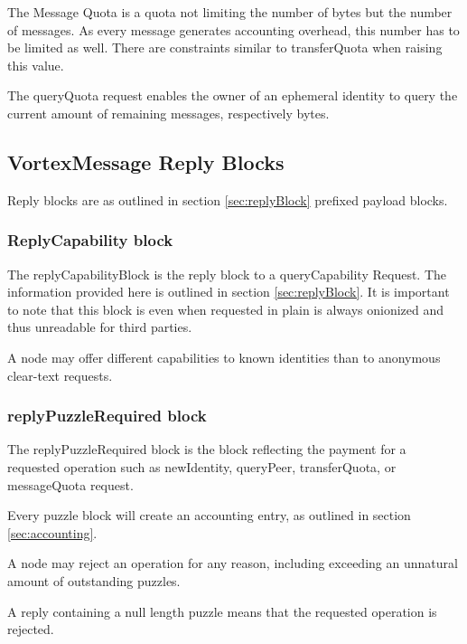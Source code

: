 The Message Quota is a quota not limiting the number of bytes but the number of messages. As every message generates accounting overhead, this number has to be limited as well. There are constraints similar to transferQuota when raising this value.

The queryQuota request enables the owner of an ephemeral identity to query the current amount of remaining messages, respectively bytes.

\subsection{VortexMessage Reply Blocks}
Reply blocks are as outlined in section \ref{sec:replyBlock} prefixed payload blocks. 

\subsubsection{ReplyCapability block}
The replyCapabilityBlock is the reply block to a queryCapability Request. The information provided here is outlined in section \ref{sec:replyBlock}. It is important to note that this block is even when requested in plain is always onionized and thus unreadable for third parties. 

A node may offer different capabilities to known identities than to anonymous clear-text requests.

\subsubsection{replyPuzzleRequired block}


The replyPuzzleRequired block is the block reflecting the payment for a requested operation such as newIdentity, queryPeer, transferQuota, or messageQuota request.

Every puzzle block will create an accounting entry, as outlined in section \ref{sec:accounting}. 

A node may reject an operation for any reason, including exceeding an unnatural amount of outstanding puzzles.

A reply containing a null length puzzle means that the requested operation is rejected.

